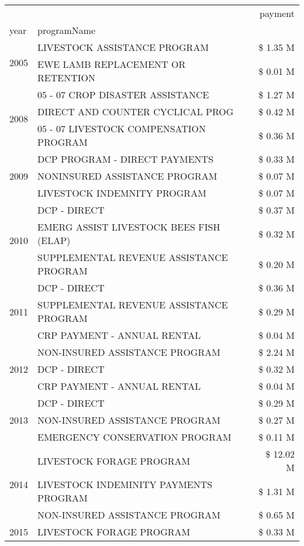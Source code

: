 \begin{tabular}{llr}
\toprule
 &  & payment \\
year & programName &  \\
\midrule
\multirow[t]{2}{*}{2005} & LIVESTOCK ASSISTANCE PROGRAM & \$ 1.35 M \\
 & EWE LAMB REPLACEMENT OR RETENTION & \$ 0.01 M \\
\cline{1-3}
\multirow[t]{3}{*}{2008} & 05 - 07 CROP DISASTER ASSISTANCE & \$ 1.27 M \\
 & DIRECT AND COUNTER CYCLICAL PROG & \$ 0.42 M \\
 & 05 - 07 LIVESTOCK COMPENSATION PROGRAM & \$ 0.36 M \\
\cline{1-3}
\multirow[t]{3}{*}{2009} & DCP PROGRAM - DIRECT PAYMENTS & \$ 0.33 M \\
 & NONINSURED ASSISTANCE PROGRAM & \$ 0.07 M \\
 & LIVESTOCK INDEMNITY PROGRAM & \$ 0.07 M \\
\cline{1-3}
\multirow[t]{3}{*}{2010} & DCP - DIRECT & \$ 0.37 M \\
 & EMERG ASSIST LIVESTOCK BEES FISH (ELAP) & \$ 0.32 M \\
 & SUPPLEMENTAL REVENUE ASSISTANCE PROGRAM & \$ 0.20 M \\
\cline{1-3}
\multirow[t]{3}{*}{2011} & DCP - DIRECT & \$ 0.36 M \\
 & SUPPLEMENTAL REVENUE ASSISTANCE PROGRAM & \$ 0.29 M \\
 & CRP PAYMENT - ANNUAL RENTAL & \$ 0.04 M \\
\cline{1-3}
\multirow[t]{3}{*}{2012} & NON-INSURED ASSISTANCE PROGRAM & \$ 2.24 M \\
 & DCP - DIRECT & \$ 0.32 M \\
 & CRP PAYMENT - ANNUAL RENTAL & \$ 0.04 M \\
\cline{1-3}
\multirow[t]{3}{*}{2013} & DCP - DIRECT & \$ 0.29 M \\
 & NON-INSURED ASSISTANCE PROGRAM & \$ 0.27 M \\
 & EMERGENCY CONSERVATION PROGRAM & \$ 0.11 M \\
\cline{1-3}
\multirow[t]{3}{*}{2014} & LIVESTOCK FORAGE PROGRAM & \$ 12.02 M \\
 & LIVESTOCK INDEMINITY PAYMENTS PROGRAM & \$ 1.31 M \\
 & NON-INSURED ASSISTANCE PROGRAM & \$ 0.65 M \\
\cline{1-3}
\multirow[t]{3}{*}{2015} & LIVESTOCK FORAGE PROGRAM & \$ 0.33 M \\

\end{tabular}
